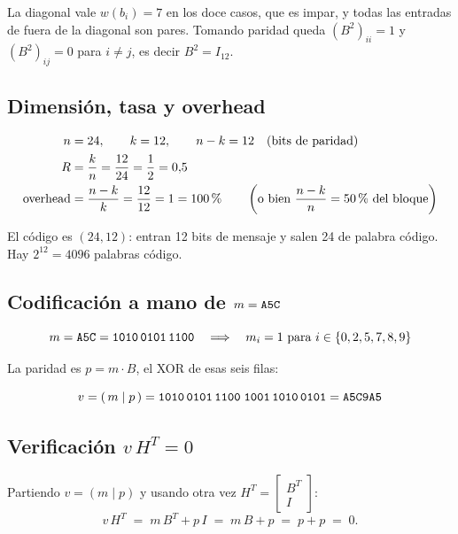 \documentclass[11pt,a4paper]{article}
\begin{document}
\begin{center}\footnotesize

\end{center}

La diagonal vale $w(b_i)=7$ en los doce casos, que es impar, y todas las
entradas de fuera de la diagonal son pares. Tomando paridad queda
$(B^2)_{ii}=1$ y $(B^2)_{ij}=0$ para $i\neq j$, es decir $B^2=I_{12}$.

\subsection{Dimensión, tasa y overhead}

\begin{align*}
  n &= 24, \qquad k = 12, \qquad n-k = 12 \quad\text{(bits de paridad)}\\
  R &= \frac{k}{n} = \frac{12}{24} = \frac{1}{2} = 0{,}5 \\
  \text{overhead} &= \frac{n-k}{k} = \frac{12}{12} = 1 = \text{100\,\%}
  \qquad\left(\text{o bien } \frac{n-k}{n}=\text{50\,\%}\ \text{del bloque}\right)
\end{align*}

El código es $(24,12)$: entran 12 bits de mensaje y salen 24 de palabra
código. Hay $2^{12}=4096$ palabras código.

\subsection{Codificación a mano de $m=\texttt{A5C}$}

\[
  m = \texttt{A5C} = \texttt{1010\,0101\,1100}
  \quad\Longrightarrow\quad
  m_i = 1 \text{ para } i \in \{0,2,5,7,8,9\}
\]

La paridad es $p=m\cdot B$, el XOR de esas seis filas:

\begin{center}\small

\end{center}

\[
  v = (\,m \mid p\,) = \texttt{1010\,0101\,1100}\;\texttt{1001\,1010\,0101}
    = \texttt{A5C9A5}
\]

\subsection{Verificación $v\,H^{T}=0$}

Partiendo $v=(m\mid p)$ y usando otra vez $H^{T}=\left[\begin{smallmatrix}B^{T}\\ I\end{smallmatrix}\right]$:
\[
  v\,H^{T} \;=\; m\,B^{T} + p\,I \;=\; m\,B + p \;=\; p + p \;=\; 0 .
\]
\end{document}
